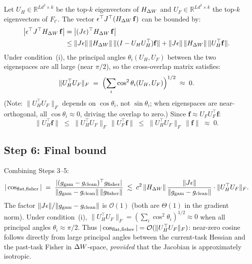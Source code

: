 Let $U_H \in \mathbb{R}^{Ld^2\times k}$ be the top-$k$ eigenvectors of $H_{\Delta W}$
and $U_F \in \mathbb{R}^{Ld^2\times k}$ the top-$k$ eigenvectors of $F_{t'}$.
The vector $\epsilon^\top J^\top(H_{\Delta W}\,\mathbf{f})$ can be bounded by:
\begin{align}
  \bigl|\epsilon^\top J^\top H_{\Delta W}\,\mathbf{f}\bigr|
  &= \bigl|(J\epsilon)^\top H_{\Delta W}\,\mathbf{f}\bigr| \notag\\
  &\leq \|J\epsilon\|\,\|H_{\Delta W}\|\,\|(I - U_H U_H^\top)\mathbf{f}\|
    + \|J\epsilon\|\,\|H_{\Delta W}\|\,\|U_H^\top\mathbf{f}\|.
  \label{eq:bound}
\end{align}
Under condition~(i), the principal angles $\theta_i(U_H, U_F)$ between the two eigenspaces
are all large (near $\pi/2$), so the cross-overlap matrix satisfies:
\begin{equation}
  \|U_H^\top U_F\|_F \;=\; \Bigl(\sum_i \cos^2\theta_i(U_H,U_F)\Bigr)^{1/2} \;\approx\; 0.
  \label{eq:uh_uf_bound}
\end{equation}
(Note: $\|U_H^\top U_F\|_F$ depends on $\cos\theta_i$, not $\sin\theta_i$; when eigenspaces are
near-orthogonal, all $\cos\theta_i \approx 0$, driving the overlap to zero.)
Since $\mathbf{f} \approx U_F U_F^\top \mathbf{f}$:
\begin{equation*}
  \|U_H^\top\mathbf{f}\| \;\leq\; \|U_H^\top U_F\|_F\,\|U_F^\top\mathbf{f}\|
  \;\leq\; \|U_H^\top U_F\|_F\,\|\mathbf{f}\| \;\approx\; 0.
\end{equation*}

\subsection*{Step 6: Final bound}

Combining Steps 3--5:
\begin{equation}
  |\cos_{\mathrm{flat,fisher}}| \;=\; \frac{|(g_{\mathrm{gam}}-g_{\mathrm{clean}})^\top g_{\mathrm{fisher}}|}{\|g_{\mathrm{gam}}-g_{\mathrm{clean}}\|\,\|g_{\mathrm{fisher}}\|}
  \;\lesssim\;
  c^2\,\|H_{\Delta W}\|\,\frac{\|J\epsilon\|}{\|g_{\mathrm{gam}}-g_{\mathrm{clean}}\|}
  \cdot\|U_H^\top U_F\|_F.
  \label{eq:final_bound}
\end{equation}
The factor $\|J\epsilon\|/\|g_{\mathrm{gam}}-g_{\mathrm{clean}}\|$ is $\mathcal{O}(1)$ (both are $\Theta(1)$ in the gradient norm).
Under condition~(i), $\|U_H^\top U_F\|_F = (\sum_i\cos^2\theta_i)^{1/2} \approx 0$
when all principal angles $\theta_i \approx \pi/2$.
Thus $|\cos_{\mathrm{flat,fisher}}| = \mathcal{O}(\|U_H^\top U_F\|_F)$:
near-zero cosine follows directly from large principal angles between the current-task Hessian
and the past-task Fisher in $\Delta W$-space, \emph{provided} that the Jacobian is approximately isotropic.

